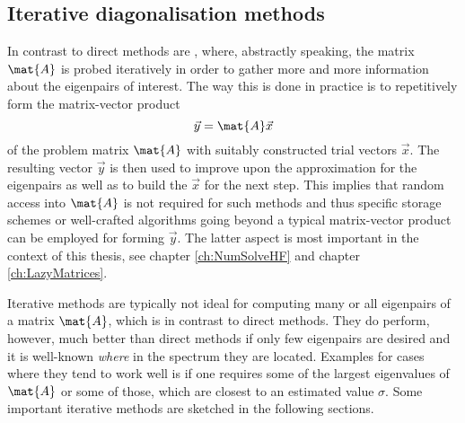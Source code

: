 \subsection{Iterative diagonalisation methods}
In contrast to direct methods are ,
where, abstractly speaking, the matrix $\mat{A}$ is probed iteratively
in order to gather more and more information
about the eigenpairs of interest.
The way this is done in practice is to repetitively form
the matrix-vector product
\[ \vec{y} = \mat{A}\vec{x} \]
of the problem matrix $\mat{A}$
with suitably constructed trial vectors $\vec{x}$.
The resulting vector $\vec{y}$ is then used
to improve upon the approximation for the eigenpairs as well as to
build the $\vec{x}$ for the next step.
This implies that random access into $\mat{A}$
is not required for such methods and thus specific storage schemes
or well-crafted algorithms going beyond a typical matrix-vector product
can be employed for forming $\vec{y}$.
The latter aspect is most important in the context of this thesis,
see chapter \vref{ch:NumSolveHF} and chapter \vref{ch:LazyMatrices}.

Iterative methods are typically not ideal for
computing many or all eigenpairs of a matrix $\mat{A}$,
which is in contrast to direct methods.
They do perform, however, much better than direct methods
if only few eigenpairs are desired
and it is well-known \emph{where} in the spectrum they are located.
Examples for cases where they tend to work well
is if one requires some of the largest eigenvalues of $\mat{A}$
or some of those, which are closest to an estimated value $\sigma$.
Some important iterative methods are sketched in the following sections.

